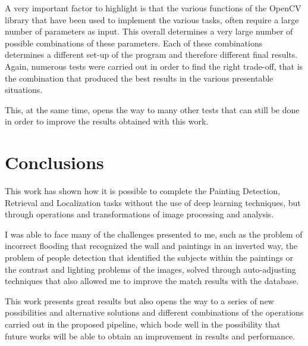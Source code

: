 \documentclass[10pt,twocolumn,letterpaper]{article}
\begin{document}
A very important factor to highlight is that the various functions of the OpenCV library that have been used to implement the various tasks, often require a large number of parameters as input. This overall determines a very large number of possible combinations of these parameters. Each of these combinations determines a different set-up of the program and therefore different final results.
Again, numerous tests were carried out in order to find the right trade-off, that is the combination that produced the best results in the various presentable situations.

This, at the same time, opens the way to many other tests that can still be done in order to improve the results obtained with this work.

\section{Conclusions}

This work has shown how it is possible to complete the Painting Detection, Retrieval and Localization tasks without the use of deep learning techniques, but through operations and transformations of image processing and analysis.

I was able to face many of the challenges presented to me, such as the problem of incorrect flooding that recognized the wall and paintings in an inverted way, the problem of people detection that identified the subjects within the paintings or the contrast and lighting problems of the images, solved through auto-adjusting techniques that also allowed me to improve the match results with the database.

This work presents great results but also opens the way to a series of new possibilities and alternative solutions and different combinations of the operations carried out in the proposed pipeline, which bode well in the possibility that future works will be able to obtain an improvement in results and performance.

{\small


}
\end{document}
